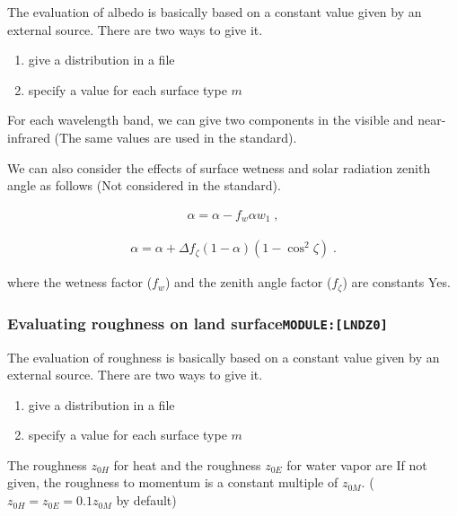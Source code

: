 The evaluation of albedo is basically based on a constant value given by
an external source. There are two ways to give it.

\begin{enumerate}
\def\labelenumi{\arabic{enumi}.}
\item
  give a distribution in a file
\item
  specify a value for each surface type \(m\)
\end{enumerate}

For each wavelength band, we can give two components in the visible and
near-infrared (The same values are used in the standard).

We can also consider the effects of surface wetness and solar radiation
zenith angle as follows (Not considered in the standard).

\begin{eqnarray}
  \alpha = \alpha - f_w \alpha w_1 \; ,
\end{eqnarray}

\begin{eqnarray}
  \alpha = \alpha + \Delta f_{\zeta} (1 - \alpha)(1 - \cos^2 \zeta) \; .
\end{eqnarray}

where the wetness factor (\(f_w\)) and the zenith angle factor
(\(f_{\zeta}\)) are constants Yes.

\hypertarget{evaluating-roughness-on-land-surfacemodulelndz0}{%
\subsubsection{\texorpdfstring{Evaluating roughness on land
surface\texttt{MODULE:{[}LNDZ0{]}}}{Evaluating roughness on land surfaceMODULE:{[}LNDZ0{]}}}\label{evaluating-roughness-on-land-surfacemodulelndz0}}

The evaluation of roughness is basically based on a constant value given
by an external source. There are two ways to give it.

\begin{enumerate}
\def\labelenumi{\arabic{enumi}.}
\item
  give a distribution in a file
\item
  specify a value for each surface type \(m\)
\end{enumerate}

The roughness \(z_{0H}\) for heat and the roughness \(z_{0E}\) for water
vapor are If not given, the roughness to momentum is a constant multiple
of \(z_{0M}\). (\(z_{0H} = z_{0E} = 0.1 z_{0M}\) by default)

